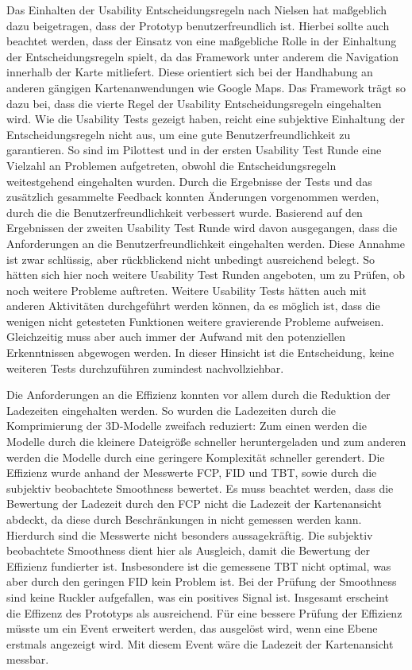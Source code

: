 Das Einhalten der Usability Entscheidungsregeln nach Nielsen \cite{Nielsen.1994} hat maßgeblich dazu beigetragen, dass der Prototyp benutzerfreundlich ist. Hierbei sollte auch beachtet werden, dass der Einsatz von \deckgl{} eine maßgebliche Rolle in der Einhaltung der Entscheidungsregeln spielt, da das Framework unter anderem die Navigation innerhalb der Karte mitliefert. Diese orientiert sich bei der Handhabung an anderen gängigen Kartenanwendungen wie Google Maps. Das Framework trägt so dazu bei, dass die vierte Regel der Usability Entscheidungsregeln \cite[Regel 4]{Nielsen.1994} eingehalten wird. Wie die Usability Tests gezeigt haben, reicht eine subjektive Einhaltung der Entscheidungsregeln nicht aus, um eine gute Benutzerfreundlichkeit zu garantieren. So sind im Pilottest und in der ersten Usability Test Runde eine Vielzahl an Problemen aufgetreten, obwohl die Entscheidungsregeln weitestgehend eingehalten wurden. Durch die Ergebnisse der Tests und das zusätzlich gesammelte Feedback konnten Änderungen vorgenommen werden, durch die die Benutzerfreundlichkeit verbessert wurde. Basierend auf den Ergebnissen der zweiten Usability Test Runde wird davon ausgegangen, dass die Anforderungen an die Benutzerfreundlichkeit eingehalten werden. Diese Annahme ist zwar schlüssig, aber rückblickend nicht unbedingt ausreichend belegt. So hätten sich hier noch weitere Usability Test Runden angeboten, um zu Prüfen, ob noch weitere Probleme auftreten. Weitere Usability Tests hätten auch mit anderen Aktivitäten durchgeführt werden können, da es möglich ist, dass die wenigen nicht getesteten Funktionen weitere gravierende Probleme aufweisen. Gleichzeitig muss aber auch immer der Aufwand mit den potenziellen Erkenntnissen abgewogen werden. In dieser Hinsicht ist die Entscheidung, keine weiteren Tests durchzuführen zumindest nachvollziehbar.

Die Anforderungen an die Effizienz konnten vor allem durch die Reduktion der Ladezeiten eingehalten werden. So wurden die Ladezeiten durch die Komprimierung der 3D-Modelle zweifach reduziert: Zum einen werden die Modelle durch die kleinere Dateigröße schneller heruntergeladen und zum anderen werden die Modelle durch eine geringere Komplexität schneller gerendert. Die Effizienz wurde anhand der Messwerte \ac{FCP}, \ac{FID} und \ac{TBT}, sowie durch die subjektiv beobachtete Smoothness bewertet. Es muss beachtet werden, dass die Bewertung der Ladezeit durch den \ac{FCP} nicht die Ladezeit der Kartenansicht abdeckt, da diese durch Beschränkungen in \deckgl{} nicht gemessen werden kann. Hierdurch sind die Messwerte nicht besonders aussagekräftig. Die subjektiv beobachtete Smoothness dient hier als Ausgleich, damit die Bewertung der Effizienz fundierter ist. Insbesondere ist die gemessene \ac{TBT} nicht optimal, was aber durch den geringen \ac{FID} kein Problem ist. Bei der Prüfung der Smoothness sind keine Ruckler aufgefallen, was ein positives Signal ist. Insgesamt erscheint die Effizenz des Prototyps als ausreichend. Für eine bessere Prüfung der Effizienz müsste \deckgl{} um ein Event erweitert werden, das ausgelöst wird, wenn eine Ebene erstmals angezeigt wird. Mit diesem Event wäre die Ladezeit der Kartenansicht messbar.

